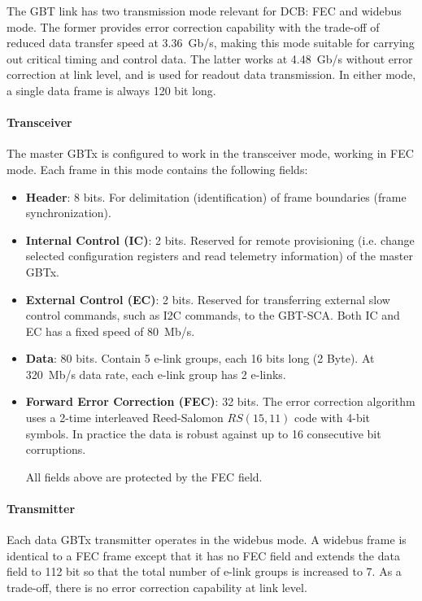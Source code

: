 The GBT link has two transmission mode relevant for DCB: FEC and widebus mode.
The former provides error correction capability with the trade-off of reduced
data transfer speed at 3.36~Gb/s,
making this mode suitable for carrying out critical timing and control data.
The latter works at 4.48~Gb/s without error correction at link level,
and is used for readout data transmission.
In either mode, a single data frame is always 120 bit long.

\paragraph{Transceiver}
The master GBTx is configured to work in the transceiver mode, working in
FEC mode.
Each frame in this mode contains the following fields:

\begin{itemize}
    \item \textbf{Header}:
        8 bits.
        For delimitation (identification) of frame boundaries
        (frame synchronization).

    \item \textbf{Internal Control (IC)}:
        2 bits.
        Reserved for remote provisioning
        (i.e. change selected configuration registers and read telemetry
        information) of the master GBTx.

    \item \textbf{External Control (EC)}:
        2 bits.
        Reserved for transferring external slow control commands,
        such as I2C commands, to the GBT-SCA.
        Both IC and EC has a fixed speed of 80~Mb/s.

    \item \textbf{Data}:
        80 bits.
        Contain 5 e-link groups, each 16 bits long (2 Byte).
        At 320~Mb/s data rate, each e-link group has 2 e-links.

    \item \textbf{Forward Error Correction (FEC)}:
        32 bits.
        The error correction algorithm uses a 2-time interleaved Reed-Salomon
        $RS(15, 11)$ code with 4-bit symbols.
        In practice the data is robust against up to 16 consecutive bit
        corruptions.

        All fields above are protected by the FEC field.
\end{itemize}

\paragraph{Transmitter}
Each data GBTx transmitter operates in the widebus mode.
A widebus frame is identical to a FEC frame except that it has no FEC field and
extends the data field to 112 bit so that the total number of e-link groups is
increased to 7.
As a trade-off, there is no error correction capability at link level.


